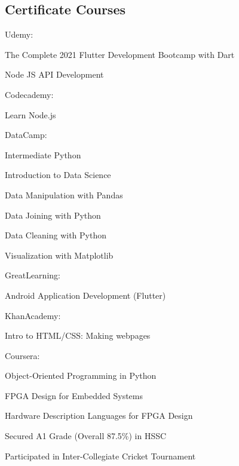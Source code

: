 \documentclass[]{m abbas resume' 2022}
\begin{document}
\begin{minipage}[t]{0.59\textwidth}
    \sectionsep
    \subsection{Certificate Courses}
    Udemy:
    \begin{tightemize}
        \item The Complete 2021 Flutter Development Bootcamp with Dart
        \item Node JS API Development
    \end{tightemize}
    Codecademy:
    \begin{tightemize}
        \item Learn Node.js
    \end{tightemize}
    DataCamp:
    \begin{tightemize}
        \item Intermediate Python
        \item Introduction to Data Science
        \item Data Manipulation with Pandas
        \item Data Joining with Python
        \item Data Cleaning with Python
        \item Visualization with Matplotlib
    \end{tightemize}
    GreatLearning:
    \begin{tightemize}
        \item Android Application Development (Flutter)
    \end{tightemize}
    KhanAcademy:
    \begin{tightemize}
        \item Intro to HTML/CSS: Making webpages
    \end{tightemize}
    Coursera:
    \begin{tightemize}
        \item Object-Oriented Programming in Python
        \item FPGA Design for Embedded Systems
        \item Hardware Description Languages for FPGA Design
    \end{tightemize}
    \sectionsep
    
     
    \begin{tightemize}
        \item Secured A1 Grade (Overall 87.5\%) in HSSC
        \item Participated in Inter-Collegiate Cricket Tournament
    \end{tightemize}
    

\end{minipage}
\end{document}
